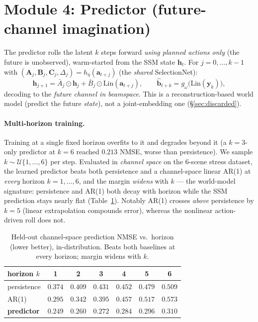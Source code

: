 \documentclass[11pt]{article}
\newcommand{\av}{\mathbf{a}}
\newcommand{\hv}{\mathbf{h}}
\newcommand{\bs}{\mathbf{b}}
\begin{document}
\section{Module 4: Predictor (future-channel imagination)}\label{sec:predictor}

The predictor rolls the latent $k$ steps forward \emph{using planned actions only} (the future is
unobserved), warm-started from the SSM state $\hv_t$. For $j=0,\dots,k-1$ with
$(\mathbf A_j,\mathbf B_j,\mathbf C_j,\Delta_j)=h_\eta(\av_{t+j})$ (the \emph{shared} SelectionNet):
\begin{equation}
\hv_{j+1}=\bar A_j\odot\hv_j+\bar B_j\odot\mathrm{Lin}(\av_{t+j}),\qquad
\hat{\bs}_{t+k}=g_\omega\big(\mathrm{Lin}(\mathbf y_k)\big),
\end{equation}
decoding to the \emph{future channel in beamspace}. This is a reconstruction-based world model
(predict the future \emph{state}), not a joint-embedding one (\S\ref{sec:discarded}).

\paragraph{Multi-horizon training.}
Training at a single fixed horizon overfits to it and degrades beyond it (a $k{=}3$-only predictor at
$k{=}6$ reached $0.213$ NMSE, worse than persistence). We sample $k\sim\mathcal U\{1,\dots,6\}$ per
step. Evaluated in \emph{channel space} on the 6-scene stress dataset, the learned predictor beats
both persistence and a channel-space linear AR(1) at \emph{every} horizon $k=1,\dots,6$, and the
margin \emph{widens} with $k$ --- the world-model signature: persistence and AR(1) both decay with
horizon while the SSM prediction stays nearly flat (Table~\ref{tab:horizon}). Notably AR(1) crosses
\emph{above} persistence by $k{=}5$ (linear extrapolation compounds error), whereas the nonlinear
action-driven roll does not.

\begin{table}[h]
\centering
\begin{tabular}{lcccccc}
\toprule
horizon $k$ & 1 & 2 & 3 & 4 & 5 & 6 \\
\midrule
persistence & $0.374$ & $0.409$ & $0.431$ & $0.452$ & $0.479$ & $0.509$ \\
AR(1)       & $0.295$ & $0.342$ & $0.395$ & $0.457$ & $0.517$ & $0.573$ \\
\textbf{predictor} & $\mathbf{0.249}$ & $\mathbf{0.260}$ & $\mathbf{0.272}$ & $\mathbf{0.284}$ & $\mathbf{0.296}$ & $\mathbf{0.310}$ \\
\bottomrule
\end{tabular}
\caption{Held-out channel-space prediction NMSE vs.\ horizon (lower better), in-distribution.
Beats both baselines at every horizon; margin widens with $k$.}
\label{tab:horizon}
\end{table}
\end{document}
